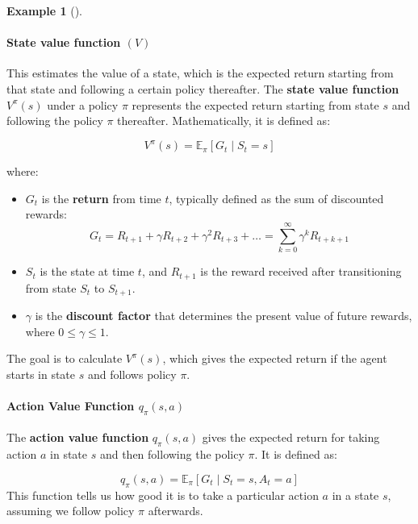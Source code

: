 \documentclass[
  letterpaper,
]{krantz}
\let\oldparagraph\paragraph
\renewcommand{\paragraph}[1]{\oldparagraph{#1}\mbox{}}
\providecommand{\tightlist}{%
  \setlength{\itemsep}{0pt}\setlength{\parskip}{0pt}}\usepackage{longtable,booktabs,array}
\theoremstyle{plain}
\theoremstyle{definition}
\newtheorem{example}{Example}[chapter]
\theoremstyle{definition}
\theoremstyle{remark}
\begin{document}
\begin{example}[]
\paragraph{\texorpdfstring{State value function
\((V)\)}{State value function (V)}}\label{state-value-function-v}

This estimates the value of a state, which is the expected return
starting from that state and following a certain policy thereafter. The
\textbf{state value function} \(V^\pi(s)\) under a policy \(\pi\)
represents the expected return starting from state \(s\) and following
the policy \(\pi\) thereafter. Mathematically, it is defined as:

\[
    V^\pi(s) = \mathbb{E}_\pi \left[ G_t \mid S_t = s \right]
\]

where:

\begin{itemize}
\tightlist
\item
  \(G_t\) is the \textbf{return} from time \(t\), typically defined as
  the sum of discounted rewards: \[
  G_t = R_{t+1} + \gamma R_{t+2} + \gamma^2 R_{t+3} + \dots = \sum_{k=0}^{\infty} \gamma^k R_{t+k+1}
  \]
\item
  \(S_t\) is the state at time \(t\), and \(R_{t+1}\) is the reward
  received after transitioning from state \(S_t\) to \(S_{t+1}\).
\item
  \(\gamma\) is the \textbf{discount factor} that determines the present
  value of future rewards, where \(0 \leq \gamma \leq 1\).
\end{itemize}

The goal is to calculate \(V^\pi(s)\), which gives the expected return
if the agent starts in state \(s\) and follows policy \(\pi\).

\paragraph{\texorpdfstring{Action Value Function
\(q_{\pi}(s, a)\)}{Action Value Function q\_\{\textbackslash pi\}(s, a)}}\label{action-value-function-q_pis-a}

The \textbf{action value function} \(q_{\pi}(s, a)\) gives the expected
return for taking action \(a\) in state \(s\) and then following the
policy \(\pi\). It is defined as:

\[
q_{\pi}(s, a) = \mathbb{E}_\pi \left[ G_t \mid S_t = s, A_t = a \right]
\] This function tells us how good it is to take a particular action
\(a\) in a state \(s\), assuming we follow policy \(\pi\) afterwards.


\end{example}
\end{document}
